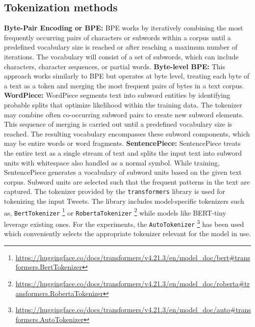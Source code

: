 \subsection{Tokenization methods}
\textbf{Byte-Pair Encoding or BPE:} BPE works by iteratively combining the most frequently occurring pairs of characters or subwords within a corpus until a predefined vocabulary size is reached or after reaching a maximum number of iterations. The vocabulary will consist of a set of subwords, which can include characters, character sequences, or partial words. \newline\newline
\textbf{Byte-level BPE:} This approach works similarly to BPE but operates at byte level, treating each byte of a text as a token and merging the most frequent pairs of bytes in a text corpus. \newline\newline
\textbf{WordPiece:} WordPiece segments text into subword entities by identifying probable splits that optimize likelihood within the training data. The tokenizer may combine often co-occurring subword pairs to create new subword elements. This sequence of merging is carried out until a predefined vocabulary size is reached. The resulting vocabulary encompasses these subword components, which may be entire words or word fragments. \newline\newline
\textbf{SentencePiece:} SentencePiece treats the entire text as a single stream of text and splits the input text into subword units with whitespace also handled as a normal symbol. While training, SentencePiece generates a vocabulary of subword units based on the given text corpus. Subword units are selected such that the frequent patterns in the text are captured.
\newline\newline
The tokenizer provided by the \texttt{transformers} library is used for tokenizing the input Tweets. The library includes model-specific tokenizers such as, \texttt{BertTokenizer} \footnote{\url{https://huggingface.co/docs/transformers/v4.21.3/en/model_doc/bert#transformers.BertTokenizer}} or \texttt{RobertaTokenizer} \footnote{\url{https://huggingface.co/docs/transformers/v4.21.3/en/model_doc/roberta#transformers.RobertaTokenizer}} while models like BERT-tiny leverage existing ones. For the experiments, the \texttt{AutoTokenizer} \footnote{\url{https://huggingface.co/docs/transformers/v4.21.3/en/model_doc/auto#transformers.AutoTokenizer}} has been used which conveniently selects the appropriate tokenizer relevant for the model in use.


